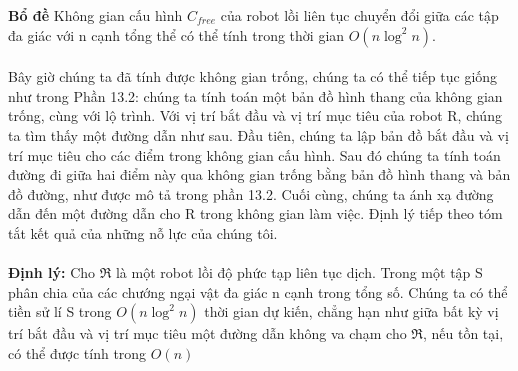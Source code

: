 \documentclass[a4paper,12pt]{report}
\begin{document}
\textbf{Bổ đề } Không gian cấu hình $C_{free}$ của robot lồi liên tục chuyển đổi giữa các tập đa giác với n cạnh tổng thể có thể tính trong thời gian $O(n\log^2n)$. \\ \\
Bây giờ chúng ta đã tính được không gian trống, chúng ta có thể tiếp tục giống như trong Phần 13.2: chúng ta tính toán một bản đồ hình thang của không gian trống, cùng với lộ trình. Với vị trí bắt đầu và vị trí mục tiêu của robot R, chúng ta tìm thấy một đường dẫn như sau. Đầu tiên, chúng ta lập bản đồ bắt đầu và vị trí mục tiêu cho các điểm trong không gian cấu hình. Sau đó chúng ta tính toán đường đi giữa hai điểm này qua không gian trống bằng bản đồ hình thang và bản đồ đường, như được mô tả trong phần 13.2. Cuối cùng, chúng ta ánh xạ đường dẫn đến một đường dẫn cho R trong không gian làm việc. Định lý tiếp theo tóm tắt kết quả của những nỗ lực của chúng tôi. \\ \\ 
\textbf{Định lý: } Cho $\Re$ là một robot lồi độ phức tạp liên tục dịch. Trong một tập S phân chia của các chướng ngại vật đa giác n cạnh trong tổng số. Chúng ta có thể tiền sử lí S trong $O (n\log^2n)$ thời gian dự kiến, chẳng hạn như giữa bất kỳ vị trí bắt đầu và vị trí mục tiêu một đường dẫn không va chạm cho $\Re$, nếu tồn tại, có thể được tính trong $O(n)$


\begin{thebibliography}{9} 

\end{thebibliography}
\end{document}
